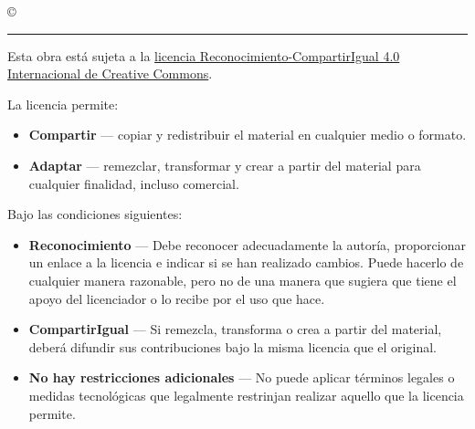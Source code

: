 \thispagestyle{empty}

\hfill

\vfill

\textit{\myTitle} \copyright\ \myTime \myName \\ \bigskip

\par\vspace*{\dimexpr-\parskip-\baselineskip+6pt}
\noindent\rule{\textwidth}{0.5pt}

Esta obra está sujeta a la \href{https://creativecommons.org/licenses/by-sa/4.0/legalcode}{licencia Reconocimiento-CompartirIgual 4.0 Internacional de Creative Commons}.

La licencia permite:
\begin{itemize}
	\item[] \textbf{Compartir} --- copiar y redistribuir el material en cualquier medio o formato.
	\item[] \textbf{Adaptar} --- remezclar, transformar y crear a partir del material
para cualquier finalidad, incluso comercial.
\end{itemize}

Bajo las condiciones siguientes:
\begin{itemize}
	\item[] \textbf{Reconocimiento} --- Debe reconocer adecuadamente la autoría, proporcionar un enlace a la licencia e indicar si se han realizado cambios. Puede hacerlo de cualquier manera razonable, pero no de una manera que sugiera que tiene el apoyo del licenciador o lo recibe por el uso que hace. 
	\item[] \textbf{CompartirIgual} --- Si remezcla, transforma o crea a partir del material, deberá difundir sus contribuciones bajo la misma licencia que el original.
	\item[] \textbf{No hay restricciones adicionales} --- No puede aplicar términos legales o medidas tecnológicas que legalmente restrinjan realizar aquello que la licencia permite.
\end{itemize}
\clearpage
